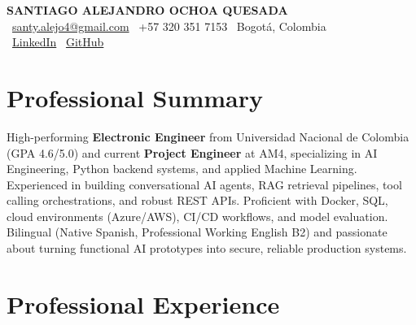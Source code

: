 \documentclass[11pt,a4paper]{article}
\begin{document}
\thispagestyle{empty}
\color{darktext}

\begin{center}
    {\Huge \bfseries\color{accent} SANTIAGO ALEJANDRO OCHOA QUESADA} \\[6pt]
    {\small\color{darktext}
    \faEnvelope\ \href{mailto:santy.alejo4@gmail.com}{santy.alejo4@gmail.com}
    \quad\textcolor{bulletline}{\textbar}\quad
    \faPhone\ +57 320 351 7153
    \quad\textcolor{bulletline}{\textbar}\quad
    \faMapMarker*\ Bogotá, Colombia \\[4pt]
    \faLinkedin\ \href{https://linkedin.com/in/santiago-alejandro-ochoa-quesada-a07a18288/}{LinkedIn}
    \quad\textcolor{bulletline}{\textbar}\quad
    \faGithub\ \href{https://github.com/Sochoaq}{GitHub}
    }
\end{center}
\vspace{4pt}

\section{Professional Summary}
High-performing \textbf{Electronic Engineer} from Universidad Nacional de Colombia (GPA 4.6/5.0) and current \textbf{Project Engineer} at AM4, specializing in AI Engineering, Python backend systems, and applied Machine Learning. Experienced in building conversational AI agents, RAG retrieval pipelines, tool calling orchestrations, and robust REST APIs. Proficient with Docker, SQL, cloud environments (Azure/AWS), CI/CD workflows, and model evaluation. Bilingual (Native Spanish, Professional Working English B2) and passionate about turning functional AI prototypes into secure, reliable production systems.

\section{Professional Experience}
\end{document}
